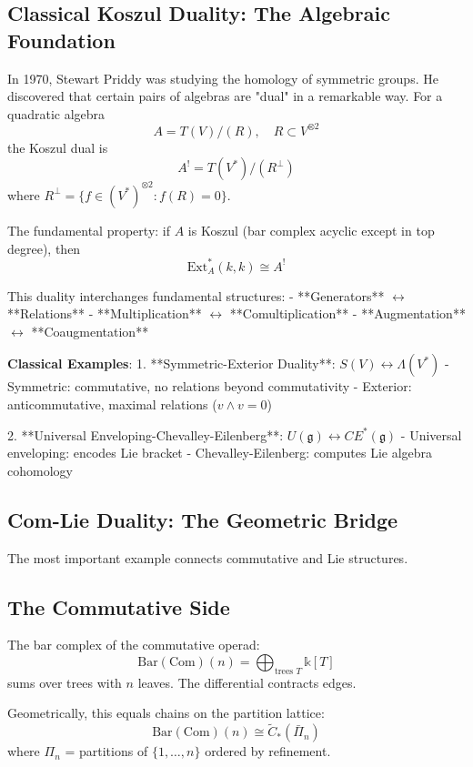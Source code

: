\subsection{Classical Koszul Duality: The Algebraic Foundation}

In 1970, Stewart Priddy was studying the homology of symmetric groups. He discovered that certain pairs of algebras are "dual" in a remarkable way. For a quadratic algebra
$$A = T(V)/(R), \quad R \subset V^{\otimes 2}$$
the Koszul dual is
$$A^! = T(V^*)/(R^\perp)$$
where $R^\perp = \{f \in (V^*)^{\otimes 2} : f(R) = 0\}$.

The fundamental property: if $A$ is Koszul (bar complex acyclic except in top degree), then
$$\text{Ext}_A^*(k, k) \cong A^!$$

This duality interchanges fundamental structures:
- **Generators** $\leftrightarrow$ **Relations**
- **Multiplication** $\leftrightarrow$ **Comultiplication**
- **Augmentation** $\leftrightarrow$ **Coaugmentation**

\textbf{Classical Examples}:
1. **Symmetric-Exterior Duality**: $S(V) \leftrightarrow \Lambda(V^*)$
   - Symmetric: commutative, no relations beyond commutativity
   - Exterior: anticommutative, maximal relations ($v \wedge v = 0$)

2. **Universal Enveloping-Chevalley-Eilenberg**: $U(\mathfrak{g}) \leftrightarrow CE^*(\mathfrak{g})$
   - Universal enveloping: encodes Lie bracket
   - Chevalley-Eilenberg: computes Lie algebra cohomology

\subsection{Com-Lie Duality: The Geometric Bridge}

The most important example connects commutative and Lie structures.

\subsection{The Commutative Side}

The bar complex of the commutative operad:
$$\text{Bar}(\text{Com})(n) = \bigoplus_{\text{trees } T} \mathbb{k}[T]$$
sums over trees with $n$ leaves. The differential contracts edges.

Geometrically, this equals chains on the partition lattice:
$$\text{Bar}(\text{Com})(n) \cong \tilde{C}_*(\bar{\Pi}_n)$$
where $\Pi_n$ = partitions of $\{1, \ldots, n\}$ ordered by refinement.

